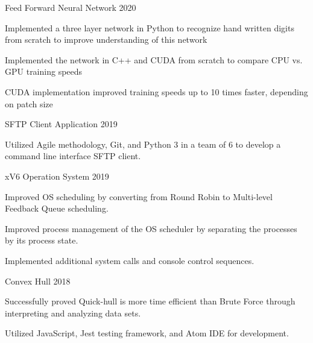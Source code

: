 
\begin{cventries}
  \cvproject
    {Feed Forward Neural Network}
    {2020}
    {
      \begin{cvitems}
        \item {Implemented a three layer network in Python to recognize hand written digits from scratch to improve understanding of this network}
        \item {Implemented the network in C++ and CUDA from scratch to compare CPU vs. GPU training speeds}
        \item {CUDA implementation improved training speeds up to 10 times faster, depending on patch size}
      \end{cvitems}
    }
  \cvproject
    {SFTP Client Application} %
    {2019} %
    {
      \begin{cvitems} %
        \item {Utilized Agile methodology, Git, and Python 3 in a team of 6 to develop a command line interface SFTP client.}
      \end{cvitems}
    }

 \cvproject
    {xV6 Operation System} %
    {2019} %
    {
      \begin{cvitems} %
        \item {Improved OS scheduling by converting from Round Robin to Multi-level Feedback Queue scheduling.}
        \item {Improved process management of the OS scheduler by separating the processes by its process state.}
        \item {Implemented additional system calls and console control sequences.}
      \end{cvitems}
    }

  \cvproject
     {Convex Hull}
     {2018}
     {
       \begin{cvitems}
         \item {Successfully proved Quick-hull is more time efficient than Brute Force through interpreting and analyzing data sets.}
         \item {Utilized JavaScript, Jest testing framework, and Atom IDE for development.}
       \end{cvitems}
     }
\end{cventries}
